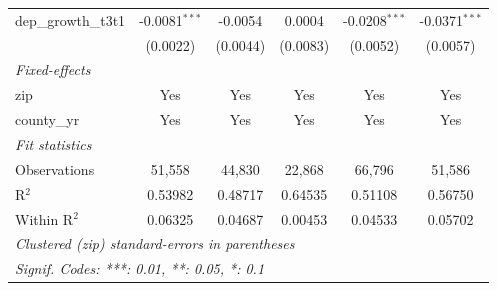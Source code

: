 \begin{tabular}{lccccc}
   dep\_growth\_t3t1                             & -0.0081$^{***}$ & -0.0054         & 0.0004          & -0.0208$^{***}$ & -0.0371$^{***}$\\   
                                                 & (0.0022)        & (0.0044)        & (0.0083)        & (0.0052)        & (0.0057)\\   
   \midrule
   \emph{Fixed-effects}\\
   zip                                           & Yes             & Yes             & Yes             & Yes             & Yes\\  
   county\_yr                                    & Yes             & Yes             & Yes             & Yes             & Yes\\  
   \midrule
   \emph{Fit statistics}\\
   Observations                                  & 51,558          & 44,830          & 22,868          & 66,796          & 51,586\\  
   R$^2$                                         & 0.53982         & 0.48717         & 0.64535         & 0.51108         & 0.56750\\  
   Within R$^2$                                  & 0.06325         & 0.04687         & 0.00453         & 0.04533         & 0.05702\\  
   \midrule \midrule
   \multicolumn{6}{l}{\emph{Clustered (zip) standard-errors in parentheses}}\\
   \multicolumn{6}{l}{\emph{Signif. Codes: ***: 0.01, **: 0.05, *: 0.1}}\\
\end{tabular}
\par\endgroup
